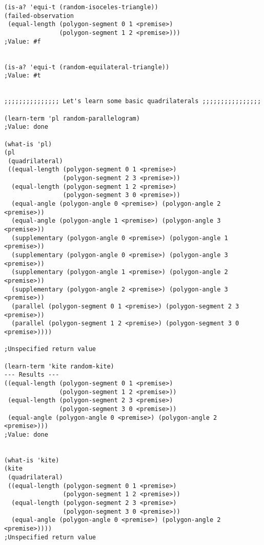 \begin{verbatim}
(is-a? 'equi-t (random-isoceles-triangle))
(failed-observation
 (equal-length (polygon-segment 0 1 <premise>)
               (polygon-segment 1 2 <premise>)))
;Value: #f


(is-a? 'equi-t (random-equilateral-triangle))
;Value: #t


;;;;;;;;;;;;;;; Let's learn some basic quadrilaterals ;;;;;;;;;;;;;;;;

(learn-term 'pl random-parallelogram)
;Value: done

(what-is 'pl)
(pl
 (quadrilateral)
 ((equal-length (polygon-segment 0 1 <premise>)
                (polygon-segment 2 3 <premise>))
  (equal-length (polygon-segment 1 2 <premise>)
                (polygon-segment 3 0 <premise>))
  (equal-angle (polygon-angle 0 <premise>) (polygon-angle 2 <premise>))
  (equal-angle (polygon-angle 1 <premise>) (polygon-angle 3 <premise>))
  (supplementary (polygon-angle 0 <premise>) (polygon-angle 1 <premise>))
  (supplementary (polygon-angle 0 <premise>) (polygon-angle 3 <premise>))
  (supplementary (polygon-angle 1 <premise>) (polygon-angle 2 <premise>))
  (supplementary (polygon-angle 2 <premise>) (polygon-angle 3 <premise>))
  (parallel (polygon-segment 0 1 <premise>) (polygon-segment 2 3 <premise>))
  (parallel (polygon-segment 1 2 <premise>) (polygon-segment 3 0 <premise>))))

;Unspecified return value

(learn-term 'kite random-kite)
--- Results ---
((equal-length (polygon-segment 0 1 <premise>)
               (polygon-segment 1 2 <premise>))
 (equal-length (polygon-segment 2 3 <premise>)
               (polygon-segment 3 0 <premise>))
 (equal-angle (polygon-angle 0 <premise>) (polygon-angle 2 <premise>)))
;Value: done


(what-is 'kite)
(kite
 (quadrilateral)
 ((equal-length (polygon-segment 0 1 <premise>)
                (polygon-segment 1 2 <premise>))
  (equal-length (polygon-segment 2 3 <premise>)
                (polygon-segment 3 0 <premise>))
  (equal-angle (polygon-angle 0 <premise>) (polygon-angle 2 <premise>))))
;Unspecified return value



\end{verbatim}
